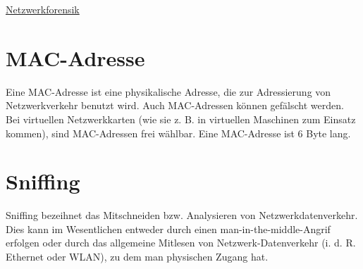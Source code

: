 \raggedright
\footnotesize
\begin{multicols}{3}	
	\setlength{\premulticols}{1pt}
	\setlength{\postmulticols}{1pt}
	\setlength{\multicolsep}{1pt}
	\setlength{\columnsep}{2pt}

\begin{center}
     \Large{\underline{Netzwerkforensik}} \\
\end{center}

\section{MAC-Adresse}
Eine MAC-Adresse ist eine physikalische Adresse, die zur Adressierung von Netzwerkverkehr benutzt wird. Auch MAC-Adressen können gefälscht werden. Bei virtuellen Netzwerkkarten (wie sie z. B. in virtuellen Maschinen zum Einsatz kommen), sind MAC-Adressen frei wählbar. Eine MAC-Adresse ist 6 Byte lang.
\section{Sniffing}
Sniffing bezeihnet das Mitschneiden bzw. Analysieren von Netzwerkdatenverkehr. Dies kann im Wesentlichen entweder durch einen man-in-the-middle-Angrif erfolgen oder durch das allgemeine Mitlesen von Netzwerk-Datenverkehr (i. d. R. Ethernet oder WLAN), zu dem man physischen Zugang hat. 

\end{multicols}
